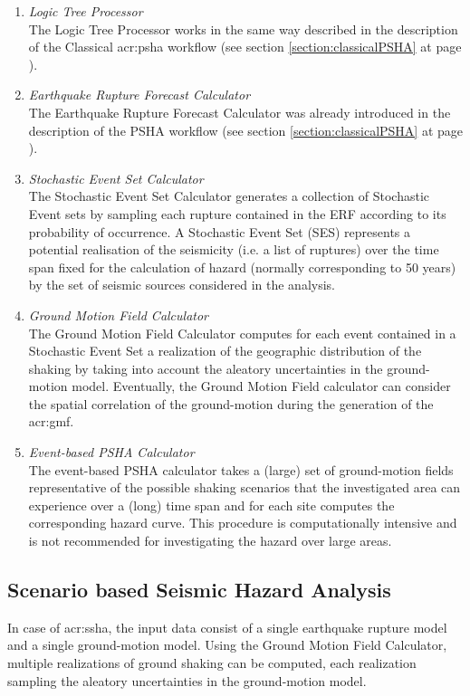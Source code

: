 \begin{enumerate}
%
\item \emph{Logic Tree Processor} \hfill \\
The Logic Tree Processor works in the same way described in 
the description of the Classical \gls{acr:psha} workflow 
(see section \ref{section:classicalPSHA} at page 
\pageref{section:classicalPSHA}).
%
\item \emph{Earthquake Rupture Forecast Calculator} \hfill \\ 
The Earthquake Rupture Forecast Calculator was already 
introduced in the description of the PSHA workflow (see section 
\ref{section:classicalPSHA} at page \pageref{section:classicalPSHA}).
%
\item \emph{Stochastic Event Set Calculator} \hfill \\
The Stochastic Event Set Calculator generates a collection of Stochastic Event sets by sampling each rupture contained in the ERF according to its 
probability of occurrence. A Stochastic Event Set (SES) represents
a potential realisation of the seismicity (i.e. a list of ruptures) 
over the time span fixed for the calculation
of hazard (normally corresponding to 50 years) by the set of seismic sources considered in the analysis. 
%
\item \emph{Ground Motion Field Calculator} \hfill \\
The Ground Motion Field Calculator computes for each event contained in a 
Stochastic Event Set a realization of the geographic distribution of the shaking by taking into account the aleatory uncertainties in 
the ground-motion model. Eventually, the Ground Motion Field calculator 
can consider the spatial correlation of the ground-motion during the 
generation of the \gls{acr:gmf}.
%
\item \emph{Event-based PSHA Calculator} \hfill \\
The event-based PSHA calculator takes a (large) set of ground-motion 
fields representative of the possible shaking scenarios that the investigated area can experience over a (long) time span and for each 
site computes the corresponding hazard curve. 
%
This procedure is computationally intensive and is not recommended for 
investigating the hazard over large areas. 
\end{enumerate}
%
\subsection{Scenario based Seismic Hazard Analysis}
\label{section:deterministicSHA}
In case of \gls{acr:ssha}, the input data consist of a single earthquake 
rupture model and a single ground-motion model. Using the Ground Motion Field 
Calculator, multiple realizations of ground shaking can be computed, each 
realization sampling the aleatory uncertainties in the ground-motion model.

